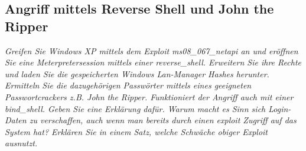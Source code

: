 \subsection{Angriff mittels Reverse Shell und John the Ripper}
\textit{Greifen Sie Windows XP mittels dem Exploit ms08\_067\_netapi an und eröffnen Sie eine Meterpretersession mittels einer reverse\_shell. Erweitern Sie ihre Rechte und laden Sie die gespeicherten Windows Lan-Manager Hashes herunter. Ermitteln Sie die dazugehörigen Passwörter mittels eines geeigneten Passwortcrackers z.B. John the Ripper. Funktioniert der Angriff auch mit einer bind\_shell. Geben Sie eine Erklärung dafür. Warum macht es Sinn sich Login-Daten zu verschaffen, auch wenn man bereits durch einen exploit Zugriff auf das System hat? Erklären Sie in einem Satz, welche Schwäche obiger Exploit ausnutzt.}\\

